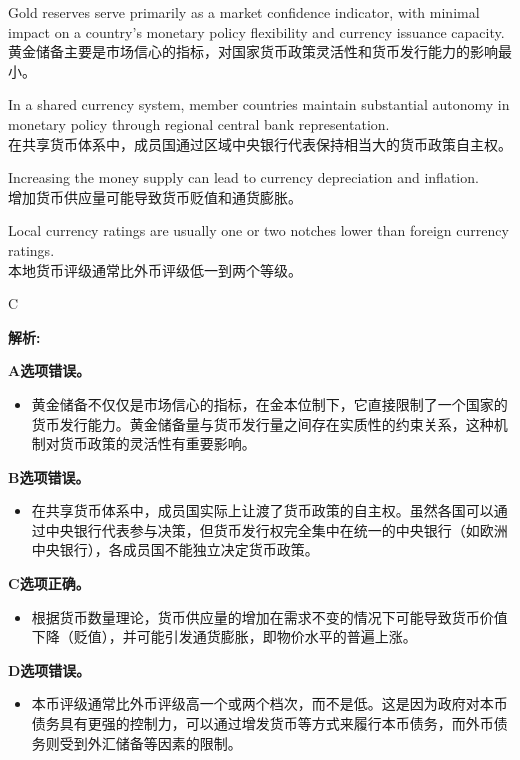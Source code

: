 \documentclass{article}
\newenvironment{explanation}
{\textbf{解析:}\par}
{\par}
\begin{document}
\begin{choices}
    \item Gold reserves serve primarily as a market confidence indicator, with minimal impact on a country's monetary policy flexibility and currency issuance capacity.\\
    黄金储备主要是市场信心的指标，对国家货币政策灵活性和货币发行能力的影响最小。
    \item In a shared currency system, member countries maintain substantial autonomy in monetary policy through regional central bank representation.\\
    在共享货币体系中，成员国通过区域中央银行代表保持相当大的货币政策自主权。
    \item Increasing the money supply can lead to currency depreciation and inflation.\\
    增加货币供应量可能导致货币贬值和通货膨胀。
    \item Local currency ratings are usually one or two notches lower than foreign currency ratings.\\
    本地货币评级通常比外币评级低一到两个等级。
\end{choices}

\begin{correctanswer}
    C
\end{correctanswer}

\begin{explanation}
    \textbf{A选项错误。}
    \begin{itemize}
        \item 黄金储备不仅仅是市场信心的指标，在金本位制下，它直接限制了一个国家的货币发行能力。黄金储备量与货币发行量之间存在实质性的约束关系，这种机制对货币政策的灵活性有重要影响。
    \end{itemize}

    \textbf{B选项错误。}
    \begin{itemize}
        \item 在共享货币体系中，成员国实际上让渡了货币政策的自主权。虽然各国可以通过中央银行代表参与决策，但货币发行权完全集中在统一的中央银行（如欧洲中央银行），各成员国不能独立决定货币政策。
    \end{itemize}

    \textbf{C选项正确。}
    \begin{itemize}
        \item 根据货币数量理论，货币供应量的增加在需求不变的情况下可能导致货币价值下降（贬值），并可能引发通货膨胀，即物价水平的普遍上涨。
    \end{itemize}

    \textbf{D选项错误。}
    \begin{itemize}
        \item 本币评级通常比外币评级高一个或两个档次，而不是低。这是因为政府对本币债务具有更强的控制力，可以通过增发货币等方式来履行本币债务，而外币债务则受到外汇储备等因素的限制。
    \end{itemize}
\end{explanation}
\end{document}
